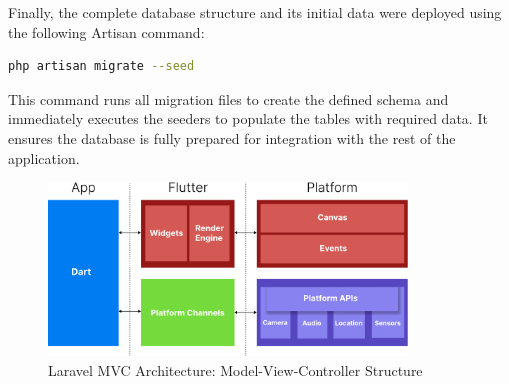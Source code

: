\documentclass[12pt]{report}
\begin{document}
\vspace{0.5cm}

Finally, the complete database structure and its initial data were deployed using the following Artisan command:

\begin{lstlisting}[style=darkbash, language=bash, caption={Laravel command to run migrations and seeders}]
php artisan migrate --seed
\end{lstlisting}

This command runs all migration files to create the defined schema and immediately executes the seeders to populate the tables with required data. It ensures the database is fully prepared for integration with the rest of the application.

\vspace{0.8cm}

\begin{figure}[H]
    \centering
    \includegraphics[width=0.85\textwidth]{images/FlutterDiagram@2x.pdf}
    \caption{Laravel MVC Architecture: Model-View-Controller Structure}
\end{figure}
\end{document}
